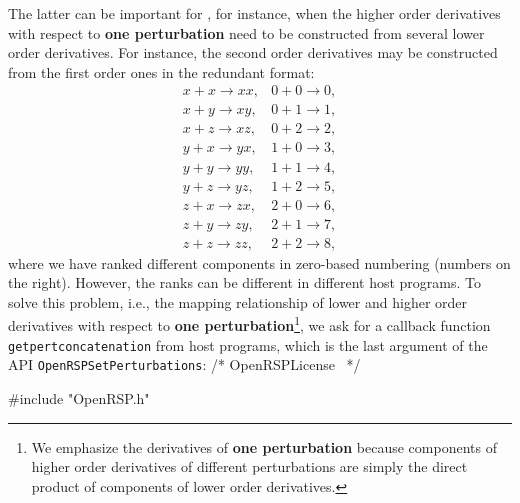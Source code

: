 The latter can be important for \LibName, for instance, when the higher order
derivatives with respect to \textbf{one perturbation} need to be constructed
from several lower order derivatives. For instance, the second order
derivatives may be constructed from the first order ones in the redundant
format:
\begin{align*}
  x+x\rightarrow xx, & 0+0\rightarrow 0,\\
  x+y\rightarrow xy, & 0+1\rightarrow 1,\\
  x+z\rightarrow xz, & 0+2\rightarrow 2,\\
  y+x\rightarrow yx, & 1+0\rightarrow 3,\\
  y+y\rightarrow yy, & 1+1\rightarrow 4,\\
  y+z\rightarrow yz, & 1+2\rightarrow 5,\\
  z+x\rightarrow zx, & 2+0\rightarrow 6,\\
  z+y\rightarrow zy, & 2+1\rightarrow 7,\\
  z+z\rightarrow zz, & 2+2\rightarrow 8,
\end{align*}
where we have ranked different components in zero-based numbering (numbers on
the right). However, the ranks can be different in different host programs. To
solve this problem, i.e., the mapping relationship of lower and higher order
derivatives with respect to \textbf{one perturbation}\footnote{We emphasize the
derivatives of \textbf{one perturbation} because components of higher order
derivatives of different perturbations are simply the direct product of
components of lower order derivatives.}, we ask for a callback function
{\tt{}get{}pert{}concatenation} from host programs, which is the last argument of
the API {\tt{}OpenRSPSetPerturbations}:
\nwenddocs{}\endmoddef
/*
  \LA{}OpenRSPLicense~{\nwtagstyle{}}\RA{}
*/

#include "OpenRSP.h"

